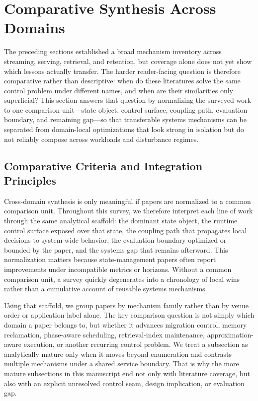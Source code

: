 \documentclass[acmsmall,screen,review]{acmart}
\begin{document}
\section{Comparative Synthesis Across Domains}
\label{sec:comparative-synthesis}

The preceding sections established a broad mechanism inventory across streaming, serving, retrieval, and retention, but coverage alone does not yet show which lessons actually transfer. The harder reader-facing question is therefore comparative rather than descriptive: when do these literatures solve the same control problem under different names, and when are their similarities only superficial? This section answers that question by normalizing the surveyed work to one comparison unit---state object, control surface, coupling path, evaluation boundary, and remaining gap---so that transferable systems mechanisms can be separated from domain-local optimizations that look strong in isolation but do not reliably compose across workloads and disturbance regimes.

\subsection{Comparative Criteria and Integration Principles}

Cross-domain synthesis is only meaningful if papers are normalized to a common comparison unit. Throughout this survey, we therefore interpret each line of work through the same analytical scaffold: the dominant state object, the runtime control surface exposed over that state, the coupling path that propagates local decisions to system-wide behavior, the evaluation boundary optimized or bounded by the paper, and the systems gap that remains afterward. This normalization matters because state-management papers often report improvements under incompatible metrics or horizons. Without a common comparison unit, a survey quickly degenerates into a chronology of local wins rather than a cumulative account of reusable systems mechanisms.

Using that scaffold, we group papers by mechanism family rather than by venue order or application label alone. The key comparison question is not simply which domain a paper belongs to, but whether it advances migration control, memory reclamation, phase-aware scheduling, retrieval-index maintenance, approximation-aware execution, or another recurring control problem. We treat a subsection as analytically mature only when it moves beyond enumeration and contrasts multiple mechanisms under a shared service boundary. That is why the more mature subsections in this manuscript end not only with literature coverage, but also with an explicit unresolved control seam, design implication, or evaluation gap.
\end{document}
